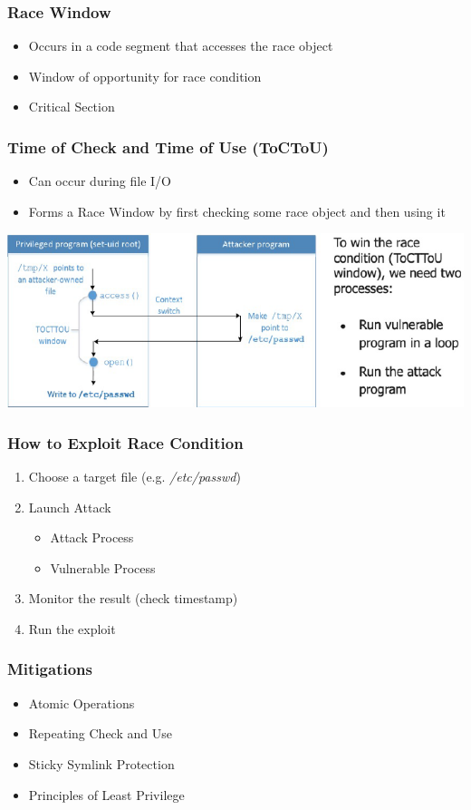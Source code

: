 \subsubsection{Race Window}
\begin{itemize}
    \item Occurs in a code segment that accesses the race object
    \item Window of opportunity for race condition
    \item Critical Section
\end{itemize}

\subsubsection{Time of Check and Time of Use (ToCToU)}
\begin{itemize}
    \item Can occur during file I/O
    \item Forms a Race Window by first checking some race object and then using it
\end{itemize}
\includegraphics[width=\linewidth]{../img/toctou.png}

\subsubsection{How to Exploit Race Condition}
\begin{enumerate}
    \item Choose a target file (e.g. \textit{/etc/passwd})
    \item Launch Attack
    \begin{itemize}
        \item Attack Process
        \item Vulnerable Process
    \end{itemize}
    \item Monitor the result (check timestamp)
    \item Run the exploit
\end{enumerate}

\subsubsection{Mitigations}
\begin{itemize}
    \item Atomic Operations
    \item Repeating Check and Use
    \item Sticky Symlink Protection
    \item Principles of Least Privilege
\end{itemize}